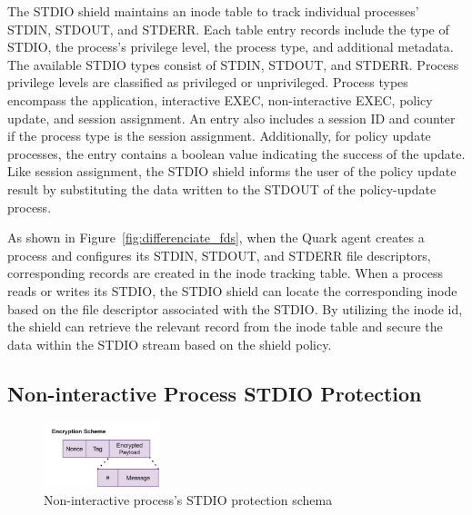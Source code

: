 The STDIO shield maintains an inode table to track individual processes' STDIN, STDOUT, and STDERR. Each table entry records include the type of STDIO, the process's privilege level, the process type, and additional metadata. The available STDIO types consist of STDIN, STDOUT, and STDERR. Process privilege levels are classified as 
privileged or unprivileged. Process types encompass the application, interactive EXEC, non-interactive EXEC, policy update, and session assignment. An entry also includes a session ID and counter if the process type is the session assignment. Additionally, for policy update processes, the entry contains a boolean 
value indicating the success of the update. Like session assignment, the STDIO shield informs the user of the policy update result by substituting the data written to the STDOUT of the policy-update process.

As shown in Figure~\ref{fig:differenciate_fds}, when the Quark agent creates a process and configures its STDIN, STDOUT, and STDERR file descriptors, corresponding records are created in the inode tracking table. When a process reads or writes its STDIO, the STDIO shield can locate the corresponding inode based on the file descriptor associated 
with the STDIO. By utilizing the inode id, the shield can retrieve the relevant record from the inode table and secure the data within the STDIO stream based on the shield policy.

\subsection{Non-interactive Process STDIO Protection}
\label{sec:design_non_interactive_stdio}
\begin{figure}[!htb]
    \centering
    \includegraphics[width=0.3\textwidth]{images/normal_io_shiled_encryption_schema.png}
    \caption[Non-interactive process's STDIO protection schema]{Non-interactive process's STDIO protection schema}
    \label{fig:normal_io_shiled}
\end{figure}


